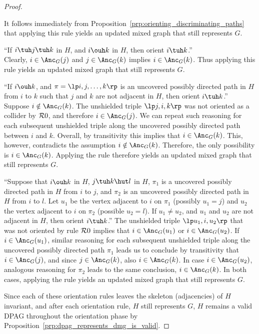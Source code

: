 \begin{proof}
\begin{description}
      It follows immediately from Proposition~\ref{prp:orienting_discriminating_paths} that applying this rule yields an updated mixed graph that still represents $G$.
    \item[$\C{R}8$] ``If $i \tuh j \tuh k$ in $H$, and $i \ouh k$ in $H$, then orient $i \tuh k$.''\\
      Clearly, $i \in \Anc_G(j)$ and $j \in \Anc_G(k)$ implies $i \in \Anc_G(k)$.
      Thus applying this rule yields an updated mixed graph that still represents $G$.
    \item[$\C{R}9$] ``If $i \ouh k$, and $\pi = \lt i, j, \dots, k \rt$ is an uncovered possibly directed path in $H$ from $i$ to $k$ such that $j$ and $k$ are not adjacent in $H$, then orient $i \tuh k$.''\\
      Suppose $i \notin \Anc_G(k)$.
      The unshielded triple $\lt j, i, k \rt$ was not oriented as a collider by $\mathcal{R}0$, and therefore $i \in \Anc_G(j)$.
      We can repeat such reasoning for each subsequent unshielded triple along the uncovered possibly directed path between $i$ and $k$.
      Overall, by transitivity this implies that $i \in \Anc_G(k)$.
      This, however, contradicts the assumption $i \notin \Anc_G(k)$.
      Therefore, the only possibility is $i \in \Anc_G(k)$.
      Applying the rule therefore yields an updated mixed graph that still represents $G$.
    \item[$\C{R}10$] ``Suppose that $i \ouh k$ in $H$, $j \tuh k \hut l$ in $H$, $\pi_1$ is a uncovered possibly directed path in $H$ from $i$ to $j$, and $\pi_2$ is an uncovered possibly directed path in $H$ from $i$ to $l$. Let $u_1$ be the vertex adjacent to $i$ on $\pi_1$ (possibly $u_1 = j$) and $u_2$ the vertex adjacent to $i$ on $\pi_2$ (possible $u_2 = l$). If $u_1 \ne u_2$, and $u_1$ and $u_2$ are not adjacent in $H$, then orient $i \tuh k$.''
      The unshielded triple $\lt u_1, i, u_2 \rt$ that was not oriented by rule $\mathcal{R}0$ implies that $i \in \Anc_G(u_1)$ or $i \in \Anc_G(u_2)$.
      If $i \in \Anc_G(u_1)$, similar reasoning for each subsequent unshielded triple along the uncovered possibly directed path $\pi_1$ leads us to conclude by transitivity that $i \in \Anc_G(j)$, and since $j \in \Anc_G(k)$, also $i \in \Anc_G(k)$.
      In case $i \in \Anc_G(u_2)$, analogous reasoning for $\pi_2$ leads to the same conclusion, $i \in \Anc_G(k)$.
      In both cases, applying the rule yields an updated mixed graph that still represents $G$.
  \end{description}
  Since each of these orientation rules leaves the skeleton (adjacencies) of $H$ invariant,
  and after each orientation rule, $H$ still represents $G$,
  $H$ remains a valid DPAG throughout the orientation phase
  by Proposition~\ref{prp:dpag_represents_dmg_is_valid}. 
\end{proof}

